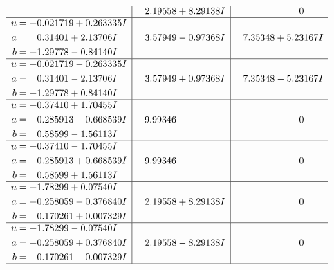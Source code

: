 \documentclass[1p]{elsarticle_modified}
\theoremstyle{definition}
\begin{document}
$$\begin{array}{c|c|c}
 & \phantom{-}2.19558 + 8.29138 I & \phantom{-0.000000 } 0 \\ \hline\begin{aligned}
u &= -0.021719 + 0.263335 I \\
a &= \phantom{-}0.31401 + 2.13706 I \\
b &= -1.29778 - 0.84140 I\end{aligned}
 & \phantom{-}3.57949 - 0.97368 I & \phantom{-}7.35348 + 5.23167 I \\ \hline\begin{aligned}
u &= -0.021719 - 0.263335 I \\
a &= \phantom{-}0.31401 - 2.13706 I \\
b &= -1.29778 + 0.84140 I\end{aligned}
 & \phantom{-}3.57949 + 0.97368 I & \phantom{-}7.35348 - 5.23167 I \\ \hline\begin{aligned}
u &= -0.37410 + 1.70455 I \\
a &= \phantom{-}0.285913 - 0.668539 I \\
b &= \phantom{-}0.58599 - 1.56113 I\end{aligned}
 & \phantom{-}9.99346\phantom{ +0.000000I} & \phantom{-0.000000 } 0 \\ \hline\begin{aligned}
u &= -0.37410 - 1.70455 I \\
a &= \phantom{-}0.285913 + 0.668539 I \\
b &= \phantom{-}0.58599 + 1.56113 I\end{aligned}
 & \phantom{-}9.99346\phantom{ +0.000000I} & \phantom{-0.000000 } 0 \\ \hline\begin{aligned}
u &= -1.78299 + 0.07540 I \\
a &= -0.258059 - 0.376840 I \\
b &= \phantom{-}0.170261 + 0.007329 I\end{aligned}
 & \phantom{-}2.19558 + 8.29138 I & \phantom{-0.000000 } 0 \\ \hline\begin{aligned}
u &= -1.78299 - 0.07540 I \\
a &= -0.258059 + 0.376840 I \\
b &= \phantom{-}0.170261 - 0.007329 I\end{aligned}
 & \phantom{-}2.19558 - 8.29138 I & \phantom{-0.000000 } 0\\
 \hline 
 \end{array}$$\newpage$$\begin{array}{c|c|c}  

\end{array}$$
\end{document}

